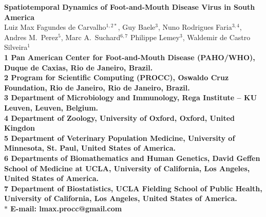 \documentclass[10pt]{article}
\date{}
\begin{document}
\begin{flushleft}
{\Large
\textbf{Spatiotemporal Dynamics of Foot-and-Mouth Disease Virus in South America}
}
\\
Luiz Max Fagundes de Carvalho$^{1,2\ast}$,
Guy Baele$^{3}$,
Nuno Rodrigues Faria$^{3,4}$,
Andres M.~Perez$^{5}$,
Marc A.~Suchard$^{6,7}$
Philippe Lemey$^{3}$,
Waldemir de Castro Silveira$^{1}$
\\
\bf{1} Pan American Center for Foot-and-Mouth Disease (PAHO/WHO), Duque de Caxias, Rio de Janeiro, Brazil.
\\
\bf{2} Program for Scientific Computing (PROCC), Oswaldo Cruz Foundation, Rio de Janeiro, Rio de Janeiro, Brazil.
\\
\bf{3} Department of Microbiology and Immunology, Rega Institute -- KU Leuven, Leuven, Belgium.
\\
\bf{4} Department of Zoology, University of Oxford, Oxford, United Kingdon
\\
\bf{5} Department of Veterinary Population Medicine, University of Minnesota, St. Paul, United States of America.
\\
\bf{6} Departments of Biomathematics and Human Genetics, David Geffen School of Medicine at UCLA, University of California, Los Angeles,  United States of America.\\
\bf{7} Department of Biostatistics, UCLA Fielding School of Public Health, University of California, Los Angeles,  United States of America.
\\
$\ast$ E-mail: lmax.procc@gmail.com
\end{flushleft}

\end{document}
